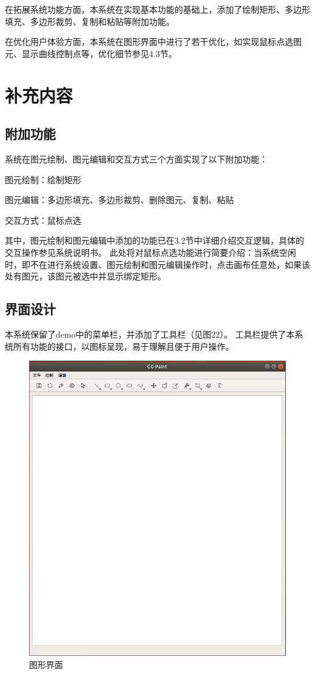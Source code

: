 \documentclass[a4paper,UTF8]{article}
\begin{document}
在拓展系统功能方面，本系统在实现基本功能的基础上，添加了绘制矩形、多边形填充、多边形裁剪、复制和粘贴等附加功能。

在优化用户体验方面，本系统在图形界面中进行了若干优化，如实现鼠标点选图元、显示曲线控制点等，优化细节参见4.3节。


\section{补充内容}
\subsection{附加功能}
系统在图元绘制、图元编辑和交互方式三个方面实现了以下附加功能：

\hspace*{2em}图元绘制：绘制矩形

\hspace*{2em}图元编辑：多边形填充、多边形裁剪、删除图元、复制、粘贴

\hspace*{2em}交互方式：鼠标点选

其中，图元绘制和图元编辑中添加的功能已在3.2节中详细介绍交互逻辑，具体的交互操作参见系统说明书。
此处将对鼠标点选功能进行简要介绍：当系统空闲时，即不在进行系统设置、图元绘制和图元编辑操作时，点击画布任意处，如果该处有图元，该图元被选中并显示绑定矩形。

\subsection{界面设计}
本系统保留了demo中的菜单栏，并添加了工具栏（见图22）。
工具栏提供了本系统所有功能的接口，以图标呈现，易于理解且便于用户操作。
\begin{figure}[H]
	\centering
	\includegraphics[scale=0.5]{gui.PNG}
	\caption{图形界面}
\end{figure}
\end{document}
